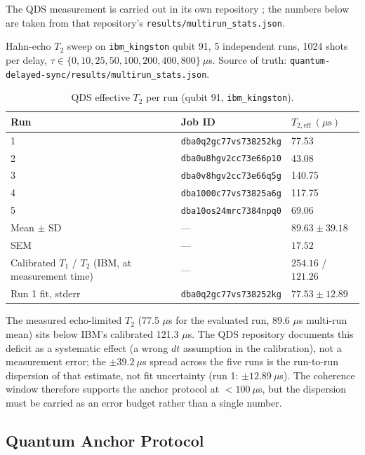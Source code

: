 \documentclass[sigconf,anonymous=false]{acmart}
\begin{document}
The QDS measurement is carried out in its own repository \cite{QDS}; the numbers below are
taken from that repository's \texttt{results/multirun\_stats.json}.

Hahn-echo $T_2$ sweep on \texttt{ibm\_kingston} qubit 91, 5 independent runs,
1024 shots per delay, $\tau \in \{0, 10, 25, 50, 100, 200, 400, 800\}\ \mu$s.
Source of truth: \texttt{quantum-delayed-sync/results/multirun\_stats.json}.

\begin{table}[h]
\centering
\caption{QDS effective $T_2$ per run (qubit 91, \texttt{ibm\_kingston}).}
\label{tab:qds}
\begin{tabular}{lll}
\toprule
Run & Job ID & $T_{2,\text{eff}}\ (\mu\text{s})$ \\
\midrule
1 & \texttt{dba0q2gc77vs738252kg} & 77.53 \\
2 & \texttt{dba0u8hgv2cc73e66p10} & 43.08 \\
3 & \texttt{dba0v8hgv2cc73e66q5g} & 140.75 \\
4 & \texttt{dba1000c77vs73825a6g} & 117.75 \\
5 & \texttt{dba10os24mrc7384npq0} & 69.06 \\
\midrule
Mean $\pm$ SD & --- & $89.63 \pm 39.18$ \\
SEM & --- & $17.52$ \\
\midrule
Calibrated $T_1$ / $T_2$ (IBM, at measurement time) & --- & $254.16$ / $121.26$ \\
Run 1 fit, stderr & \texttt{dba0q2gc77vs738252kg} & $77.53 \pm 12.89$ \\
\bottomrule
\end{tabular}
\end{table}

The measured echo-limited $T_2$ (77.5 $\mu$s for the evaluated run, 89.6 $\mu$s
multi-run mean) sits below IBM's calibrated 121.3 $\mu$s. The QDS repository
documents this deficit as a systematic effect (a wrong $dt$ assumption in the
calibration), not a measurement error; the $\pm 39.2\ \mu$s spread across the five
runs is the run-to-run dispersion of that estimate, not fit uncertainty
(run 1: $\pm 12.89\ \mu$s). The coherence window therefore supports the anchor
protocol at $< 100\ \mu$s, but the dispersion must be carried as an error budget
rather than a single number.

\subsection{Quantum Anchor Protocol}
\end{document}
